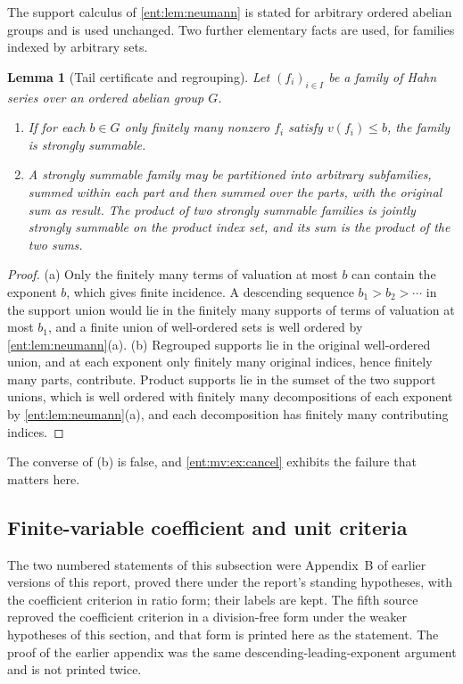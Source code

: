 \documentclass[11pt]{article}
\theoremstyle{plain}
\newtheorem{lemma}[lemma]{Lemma}
\theoremstyle{plain}
\theoremstyle{plain}
\theoremstyle{definition}
\theoremstyle{definition}
\theoremstyle{definition}
\theoremstyle{definition}
\theoremstyle{remark}
\begin{document}
The support calculus of \cref{ent:lem:neumann} is stated for arbitrary
ordered abelian groups and is used unchanged. Two further elementary facts
are used, for families indexed by arbitrary sets.

\begin{lemma}[Tail certificate and regrouping]\label{ent:mv:lem:tails}
Let $(f_i)_{i\in I}$ be a family of Hahn series over an ordered abelian
group $G$.
\begin{enumerate}[label=\textnormal{(\alph*)},leftmargin=2em]
\item If for each $b\in G$ only finitely many nonzero $f_i$ satisfy
$v(f_i)\le b$, the family is strongly summable.
\item A strongly summable family may be partitioned into arbitrary
subfamilies, summed within each part and then summed over the parts, with the
original sum as result. The product of two strongly summable families is
jointly strongly summable on the product index set, and its sum is the
product of the two sums.
\end{enumerate}
\end{lemma}
\begin{proof}
(a) Only the finitely many terms of valuation at most $b$ can contain the
exponent $b$, which gives finite incidence. A descending sequence
$b_1>b_2>\cdots$ in the support union would lie in the finitely many supports
of terms of valuation at most $b_1$, and a finite union of well-ordered sets
is well ordered by \cref{ent:lem:neumann}(a). (b) Regrouped supports lie in
the original well-ordered union, and at each exponent only finitely many
original indices, hence finitely many parts, contribute. Product supports lie
in the sumset of the two support unions, which is well ordered with finitely
many decompositions of each exponent by \cref{ent:lem:neumann}(a), and each
decomposition has finitely many contributing indices.
\end{proof}

The converse of (b) is false, and \cref{ent:mv:ex:cancel} exhibits the
failure that matters here.

\subsection{Finite-variable coefficient and unit criteria}
\label{ent:app:multivariate}
The two numbered statements of this subsection were Appendix~B of earlier
versions of this report, proved there under the report's standing
hypotheses, with the coefficient criterion in ratio form; their labels are
kept. The fifth source reproved the coefficient criterion in a
division-free form under the weaker hypotheses of this section, and that
form is printed here as the statement. The proof of the earlier appendix was
the same descending-leading-exponent argument and is not printed twice.
\end{document}
